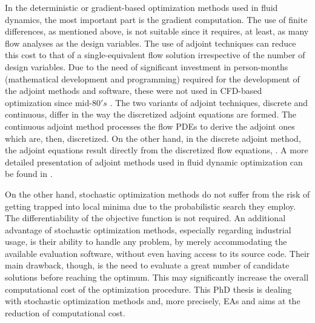 In the deterministic or gradient-based optimization methods used in fluid dynamics, the most important part is the gradient computation. The use of finite differences, as mentioned above, is not suitable since it requires, at least, as many flow analyses as the design variables. The use of adjoint techniques can reduce this cost to that of a single-equivalent flow solution irrespective of the number of design variables. Due to the need of significant investment in person-months (mathematical development and programming) required for the development of the adjoint methods and software, these were not used in CFD-based optimization since mid-$80's$ \cite{piron:84, kn:Jame88, kn:Jame94, kn:Jame95}.  The two variants of adjoint techniques, discrete and continuous, differ in the way the discretized adjoint equations are formed. The continuous adjoint method \cite{kn:Jame94, kn:Ander99,phd:papadim} processes the flow PDEs to derive the adjoint ones which are, then, discretized. On the other hand, in the discrete adjoint method, the adjoint equations result directly from the discretized flow equations, \cite{kn:Elliott96, anderson:99}. A more detailed presentation of adjoint methods used in fluid dynamic optimization can be found in \cite{phd:papadim}.        

On the other hand, stochastic optimization methods  do not suffer from the risk of getting trapped into local minima due to the probabilistic search they employ. The differentiability of the objective function is not required. An additional advantage of stochastic optimization methods, especially regarding industrial usage, is their ability to handle any problem, by merely accommodating the available evaluation software, without even having access to its source code. Their main drawback, though, is the need to evaluate a great number of candidate solutions before reaching the optimum. This may significantly increase the overall computational cost of the optimization procedure. This PhD thesis is dealing with stochastic optimization methods and, more precisely, EAs and aims at the reduction of computational cost. 

